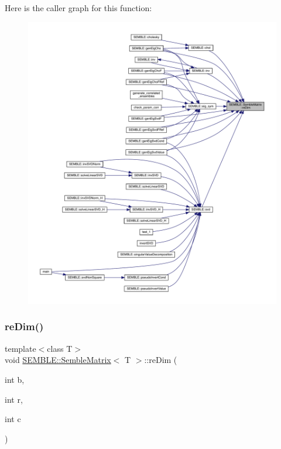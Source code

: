 Here is the caller graph for this function\+:
\nopagebreak
\begin{figure}[H]
\begin{center}
\leavevmode
\includegraphics[width=350pt]{df/d87/structSEMBLE_1_1SembleMatrix_a376b3b7cc061b6d20370cb78ade11b0e_icgraph}
\end{center}
\end{figure}
\mbox{\label{structSEMBLE_1_1SembleMatrix_a9bb9814650ff3bd6c43656781811391b}} 
\subsubsection{\texorpdfstring{reDim()}{reDim()}\hspace{0.1cm}{\footnotesize\ttfamily [3/4]}}
{\footnotesize\ttfamily template$<$class T$>$ \\
void \mbox{\hyperlink{structSEMBLE_1_1SembleMatrix}{S\+E\+M\+B\+L\+E\+::\+Semble\+Matrix}}$<$ T $>$\+::re\+Dim (\begin{DoxyParamCaption}\item[{int}]{b,  }\item[{int}]{r,  }\item[{int}]{c }\end{DoxyParamCaption})\hspace{0.3cm}{\ttfamily [inline]}}

